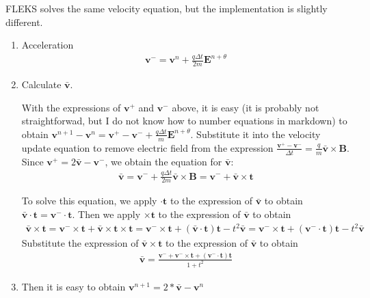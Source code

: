 \documentclass[a4paper, 11pt]{article}
\begin{document}
FLEKS solves the same velocity equation, but the implementation is slightly different.
\begin{enumerate}
    \item Acceleration 
\begin{eqnarray}
    \mathbf{v}^- = \mathbf{v}^{n} + \frac{q\Delta t}{2m}\mathbf{E}^{n+\theta}
\end{eqnarray}

\item Calculate $\bar{\mathbf{v}}$. 

With the expressions of $\mathbf{v}^+$ and $\mathbf{v}^-$ above, it is easy (it is probably not straightforwad, but I do not know how to number equations in markdown) to obtain $\mathbf{v}^{n+1} - \mathbf{v}^{n} = \mathbf{v}^+ - \mathbf{v}^- + \frac{q\Delta t}{m} \mathbf{E}^{n+\theta}$. Substitute it into the velocity update equation to remove electric field from the expression $\frac{\mathbf{v}^{+} - \mathbf{v}^{-}}{\Delta t} = \frac{q}{m}\bar{\mathbf{v}}\times\mathbf{B}$. Since $\mathbf{v}^+ = 2\bar{\mathbf{v}} - \mathbf{v}^-$, we obtain the equation for $\bar{\mathbf{v}}$:
\begin{eqnarray}
  \bar{\mathbf{v}} = \mathbf{v}^- + \frac{q\Delta t}{2m} \bar{\mathbf{v}} \times \mathbf{B} = \mathbf{v}^- + \bar{\mathbf{v}} \times \mathbf{t}   
\end{eqnarray}

To solve this equation, we apply $\cdot \mathbf{t}$ to the expression of $\bar{\mathbf{v}}$ to obtain $\bar{\mathbf{v}} \cdot \mathbf{t} = \mathbf{v}^- \cdot \mathbf{t}$. Then we apply $\times \mathbf{t}$ to the expression of $\bar{\mathbf{v}}$ to obtain
\begin{eqnarray}
\bar{\mathbf{v}} \times \mathbf{t} = \mathbf{v}^- \times \mathbf{t} + \bar{\mathbf{v}} \times \mathbf{t} \times \mathbf{t} = \mathbf{v}^- \times \mathbf{t} + (\bar{\mathbf{v}} \cdot \mathbf{t})\mathbf{t} - t^2\bar{\mathbf{v}} = \mathbf{v}^- \times \mathbf{t} + (\mathbf{v}^- \cdot \mathbf{t})\mathbf{t} - t^2\bar{\mathbf{v}}
\end{eqnarray}
Substitute the expression of $\bar{\mathbf{v}} \times \mathbf{t}$ to the expression of $\bar{\mathbf{v}}$ to obtain 
\begin{eqnarray}
\bar{\mathbf{v}} = \frac{\mathbf{v}^- + \mathbf{v}^- \times \mathbf{t} + (\mathbf{v}^- \cdot \mathbf{t})\mathbf{t}}{1+t^2}
\end{eqnarray}

\item Then it is easy to obtain $\mathbf{v}^{n+1} = 2*\bar{\mathbf{v}} - \mathbf{v}^{n}$
\end{enumerate}
\end{document}
